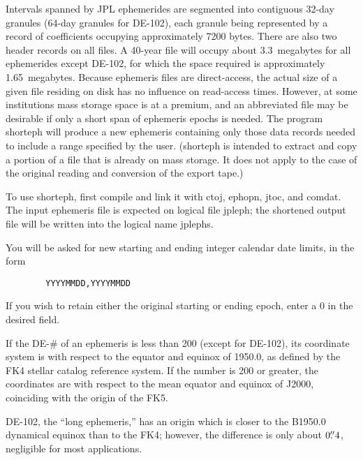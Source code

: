 \newpage                                             %
Intervals spanned by JPL ephemerides are segmented into contiguous
32-day granules (64-day granules for DE-102),
each granule being represented by a
record of coefficients occupying approximately 7200 bytes.
There are also two
header records on all files. A 40-year file will occupy about
3.3~megabytes for all ephemerides except DE-102, for which the
space required is approximately 1.65~megabytes.
Because ephemeris files are direct-access, the actual size of a given
file residing on disk has no influence on read-access times.
However, at some institutions mass storage space is at a premium, and
an abbreviated file may be desirable if only a short span of ephemeris
epochs is needed. The program {\csc shorteph} will produce a new
ephemeris containing only those data records needed to include
a range specified by the user. ({\csc shorteph} is intended to
extract and copy a portion of a file that is already on mass storage.
It does not apply to the case of the original reading and
conversion of the export tape.)
 
To use {\csc shorteph}, first compile and link it with {\csc
ctoj, ephopn, jtoc, \rm and \csc comdat}. The input ephemeris
file is expected on logical file {\csc jpleph}; the shortened output file
will be written into the logical name {\csc jplephs}.
 
You will be asked for new starting and ending integer
calendar date limits, in the form
\begin{verbatim}
        YYYYMMDD,YYYYMMDD
\end{verbatim}
If you wish to retain either the original starting or ending epoch,
enter a 0 in the desired field.
 
If the DE-\# of an ephemeris is less than 200 (except for DE-102),
its coordinate
system is with respect to the equator and equinox of 1950.0, as
defined by the FK4 stellar catalog reference system. If the number
is 200 or greater, the coordinates are with respect to the mean
equator and equinox of J2000, coinciding with the origin of the FK5.
 
DE-102, the ``long ephemeris,'' has an origin which is closer
to the B1950.0 dynamical equinox than to the FK4; however, the
difference is only about $0.\kern-3pt''4$, negligible for
most applications.
 
